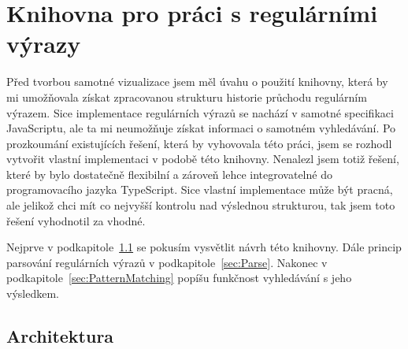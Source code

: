 \chapter{Knihovna pro práci s regulárními výrazy}\label{sec:Implementation1}

Před tvorbou samotné vizualizace jsem měl úvahu o použití knihovny, která by mi umožňovala získat zpracovanou strukturu historie průchodu regulárním výrazem.
Sice implementace regulárních výrazů se nachází v samotné specifikaci JavaScriptu,
ale ta mi neumožňuje získat informaci o samotném vyhledávání.
Po prozkoumání existujících řešení, která by vyhovovala této práci, 
jsem se rozhodl vytvořit vlastní implementaci v podobě této knihovny.
Nenalezl jsem totiž řešení, které by bylo dostatečně flexibilní a 
zároveň lehce integrovatelné do programovacího jazyka TypeScript.
Sice vlastní implementace může být pracná, ale jelikož chci mít co nejvyšší kontrolu nad výslednou strukturou, 
tak jsem toto řešení vyhodnotil za vhodné. 

Nejprve v podkapitole~\ref{sec:Imp1LayoutReal} se pokusím vysvětlit návrh této knihovny.
Dále princip parsování regulárních výrazů v podkapitole~\ref{sec:Parse}.
Nakonec v podkapitole~\ref{sec:PatternMatching} popíšu funkčnost vyhledávání s jeho výsledkem.

\section{Architektura}\label{sec:Imp1LayoutReal}

